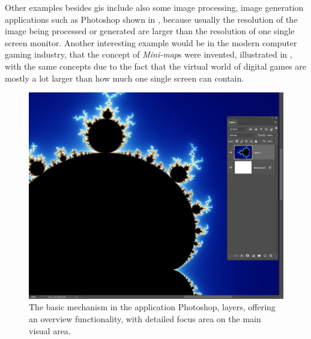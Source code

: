 Other examples besides \gls{gis} include also some image processing, image generation applications such as Photoshop shown in , because usually the resolution of the image being processed or generated are larger than the resolution of one single screen monitor. Another interesting example would be in the modern computer gaming industry, that the concept of \emph{Mini-map}s were invented, illustrated in , with the same concepts due to the fact that the virtual world of digital games are mostly a lot larger than how much one single screen can contain.

\begin{figure}[th]
\centering
\includegraphics[width=\textwidth,keepaspectratio]{Figures/Chapter1/ps.png}
\decoRule
\caption[Overview Plus Details In Photoshop]{The basic mechanism in the application Photoshop, layers, offering an overview functionality, with detailed focus area on the main visual area.}
\label{fig:ps}
\end{figure}


